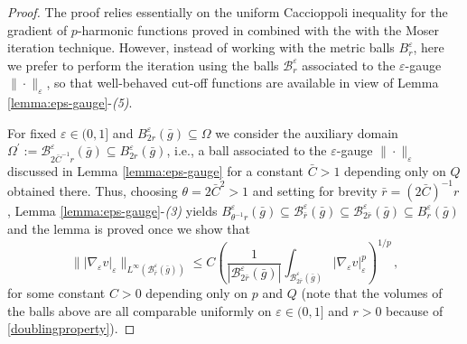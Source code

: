 \documentclass[10pt]{amsart}
\numberwithin{equation}{section}
\theoremstyle{definition}
\begin{document}
\begin{proof}
The proof relies essentially on the uniform Caccioppoli inequality for the gradient of $p$-harmonic functions proved in \cite[Theorem 5.3]{CapoCitti4} combined with the with the Moser iteration technique. However, instead of working with the metric balls $B^\varepsilon_r$, here we prefer to perform the iteration using the balls $\mathcal{B}^\varepsilon_r$  associated to the $\varepsilon$-gauge $\| \cdot \|_\varepsilon$, so that well-behaved cut-off functions are available in view of Lemma \ref{lemma:eps-gauge}-{\it (5)}. 

 For fixed $\varepsilon \in (0,1]$ and $B^\varepsilon_{2r}(\bar{g}) \subseteq \Omega$ we consider the auxiliary domain $\Omega^\prime:=\mathcal{B}^\varepsilon_{2\bar{C}^{-1}r}(\bar{g}) \subseteq B^\varepsilon_{2r}(\bar{g})$, i.e., a ball associated to the $\varepsilon$-gauge $\| \cdot \|_\varepsilon$ discussed in Lemma \ref{lemma:eps-gauge} for a constant $\bar{C}>1$ depending only on $Q$ obtained there. Thus, choosing $\theta=2 \bar{C}^2>1$ and setting for brevity $\bar{r}=(2\bar{C})^{-1}r$, Lemma \ref{lemma:eps-gauge}-{\it (3)} yields $B^\varepsilon_{\theta^{-1} r}(\bar{g}) \subseteq \mathcal{B}^\varepsilon_{\bar{r}}(\bar{g})  \subseteq \mathcal{B}^\varepsilon_{2\bar{r}}(\bar{g})\subseteq B^\varepsilon_{r}(\bar{g}) $ and the lemma is proved once we show that 
 \begin{equation}
\label{capogna-citti-bound-bis} 
\| |\nabla_\varepsilon v|_\varepsilon  \|_{L^\infty(\mathcal{B}^\varepsilon_{\bar{r}}(\bar{g}))} \leq C  \left( \frac{1}{|\mathcal{B}_{ 2\bar{r}}^\varepsilon(\bar{g})|}  \int_{ \mathcal{B}_{2\bar{r}}^\varepsilon(\bar{g})} |\nabla_\varepsilon v|_\varepsilon^p \right)^{1/p}\, ,
\end{equation}
\noindent for some constant $C>0$ depending only on $p$ and $Q$ (note that the volumes of the balls above are all comparable uniformly on $\varepsilon \in (0,1]$ and $r>0$ because of \eqref{doublingproperty}).


\end{proof}
\end{document}
